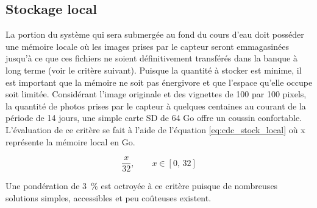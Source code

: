 

\subsection{Stockage local}
\label{s:cdc_stock_local}

La portion du système qui sera submergée au fond du cours d’eau doit posséder une mémoire locale où les images prises par le capteur seront emmagasinées jusqu’à ce que ces fichiers ne soient définitivement transférés dans la banque à long terme (voir le critère suivant). Puisque la quantité à stocker est minime, il est important que la mémoire ne soit pas énergivore et que l’espace qu’elle occupe soit limitée. Considérant l'image originale et des vignettes de 100 par 100 pixels, la quantité de photos prises par le capteur à quelques centaines au courant de la période de 14 jours, une simple carte SD de 64 Go offre un coussin confortable. L’évaluation de ce critère se fait à l’aide de l'équation \ref{eq:cdc_stock_local} où x représente la mémoire local en Go. 

\begin{equation} \label{eq:cdc_stock_local}
\frac{x}{32}, \qquad x \in [0,\,32]
\end{equation}

Une pondération de 3~\% est octroyée à ce critère puisque de nombreuses solutions simples, accessibles et peu coûteuses existent. 
